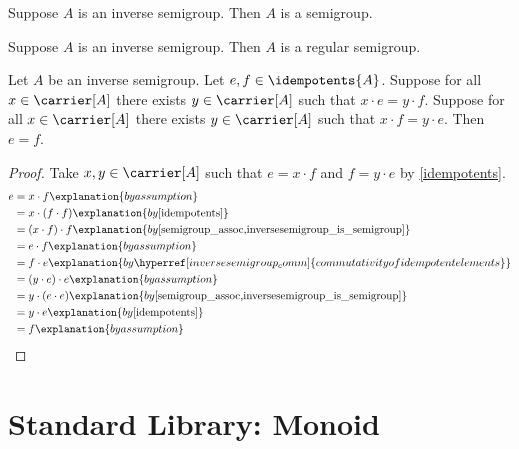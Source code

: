\begin{proposition}\label{inversesemigroup_is_semigroup}
    Suppose $A$ is an inverse semigroup.
    Then $A$ is a semigroup.
\end{proposition}


\begin{proposition}\label{inversesemigroup_is_regularsemigroup}
    Suppose $A$ is an inverse semigroup.
    Then $A$ is a regular semigroup.
\end{proposition}

\begin{proposition}\label{idempotentelems_eq_iff_orbits_eq}
    Let $A$ be an inverse semigroup.
    Let $e,f\in\idempotents{A}$.
    Suppose for all $x\in\carrier[A]$ there exists $y\in\carrier[A]$
    such that $x\cdot e = y\cdot f$.
    Suppose for all $x\in\carrier[A]$ there exists $y\in\carrier[A]$
    such that $x\cdot f = y\cdot e$.
    Then $e = f$.
\end{proposition}
\begin{proof}
    Take $x, y\in\carrier[A]$ such that $e = x\cdot f$ and $f = y\cdot e$ by \cref{idempotents}.
    \begin{align*}
        e
            &= x \cdot f
                \explanation{by assumption}\\
            &= x\cdot (f\cdot f)
                \explanation{by \cref{idempotents}}\\
            &= (x\cdot f)\cdot f
                \explanation{by \cref{semigroup_assoc,inversesemigroup_is_semigroup}}\\
            &= e\cdot f
            \explanation{by assumption}\\
            &= f\cdot e
                \explanation{by \hyperref[inversesemigroup_comm]{commutativity of idempotent elements}}\\
            &= (y\cdot e)\cdot e
                \explanation{by assumption}\\
            &= y\cdot (e\cdot e)
                \explanation{by \cref{semigroup_assoc,inversesemigroup_is_semigroup}}\\
            &= y \cdot e
                \explanation{by \cref{idempotents}}\\
            &= f
                \explanation{by assumption}
    \end{align*}
\end{proof}

\section{Standard Library: Monoid}
\label{form_sec_monoid}

